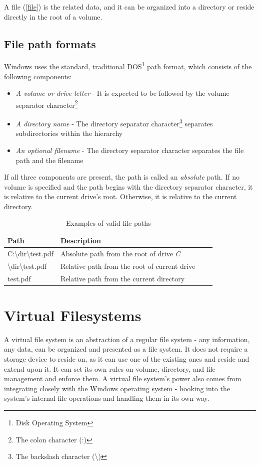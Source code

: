 A file (\ref{file}) is the related data, and it can be organized into a directory or reside directly in the root of a volume.

\subsection{File path formats}
Windows uses the standard, traditional DOS\footnote{Disk Operating System} path format, which consists of the following components:

\begin{itemize}
    \item \textit{A volume or drive letter} - It is expected to be followed by the volume separator character\footnote{The colon character (:)}
    \item \textit{A directory name} - The directory separator character\footnote{The backslash character (\textbackslash{})} separates subdirectories within the hierarchy
    \item \textit{An optional filename} - The directory separator character separates the file path and the filename
\end{itemize}

If all three components are present, the path is called an \textit{absolute} path. If no volume is specified and the path begins with the directory separator character, it is relative to the current drive's root. Otherwise, it is relative to the current directory.\cite{WinPathFormats}

\begin{table}[!hbt]
\centering
\caption{Examples of valid file paths}
\label{filepathsex}
\begin{tabular}{|l|l|l|l|}
\hline
\textbf{Path} & \textbf{Description} \\ \hline
C:\textbackslash{}dir\textbackslash{}test.pdf       & Absolute path from the root of drive \textit{C}    \\ \hline
\textbackslash{}dir\textbackslash{}test.pdf      & Relative path from the root of current drive     \\ \hline
test.pdf       & Relative path from the current directory     \\ \hline
\end{tabular}
\end{table}

\section{Virtual Filesystems}
\label{vfs}
A virtual file system is an abstraction of a regular file system - any information, any data, can be organized and presented as a file system. It does not require a storage device to reside on, as it can use one of the existing ones and reside and extend upon it. It can set its own rules on volume, directory, and file management and enforce them. A virtual file system's power also comes from integrating closely with the Windows operating system - hooking into the system's internal file operations and handling them in its own way.

